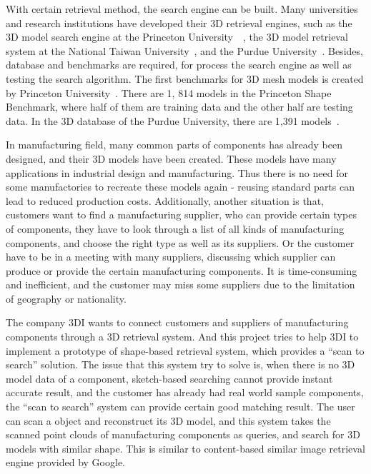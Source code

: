 With certain retrieval method, the search engine can be built. Many universities and research institutions have developed their 3D retrieval engines, such as the 3D model search engine at the Princeton University~\cite{shilane2004princeton}~\cite{min2003early}, the 3D model retrieval system at the National Taiwan University~\cite{shen20033d}, and the Purdue University~\cite{iyer2005engineering}. Besides, database and benchmarks are required, for process the search engine as well as testing the search algorithm. The first benchmarks for 3D mesh models is created by Princeton University~\cite{shilane2004princeton}. There are 1, 814 models in the Princeton Shape Benchmark, where half of them are training data and the other half are testing data. In the 3D database of the Purdue University, there are 1,391 models~\cite{iyer2005engineering}.

In manufacturing field, many common parts of components has already been designed, and their 3D models have been created. These models have many applications in industrial design and manufacturing. Thus there is no need for some manufactories to recreate these models again - reusing standard parts can lead to reduced production costs. Additionally, another situation is that, customers want to find a manufacturing supplier, who can provide certain types of components, they have to look through a list of all kinds of manufacturing components, and choose the right type as well as its suppliers. Or the customer have to be in a meeting with many suppliers, discussing which supplier can produce or provide the certain manufacturing components. It is time-consuming and inefficient, and the customer may miss some suppliers due to the limitation of geography or nationality. 

The company 3DI wants to connect customers and suppliers of manufacturing components through a 3D retrieval system. And this project tries to help 3DI to implement a prototype of shape-based retrieval system, which provides a ``scan to search'' solution. The issue that this system try to solve is, when there is no 3D model data of a component, sketch-based searching cannot provide instant accurate result, and the customer has already had real world sample components, the ``scan to search'' system can provide certain good matching result. The user can scan a object and reconstruct its 3D model, and this system takes the scanned point clouds of manufacturing components as queries, and search for 3D models with similar shape. This is similar to content-based similar image retrieval engine provided by Google. 

